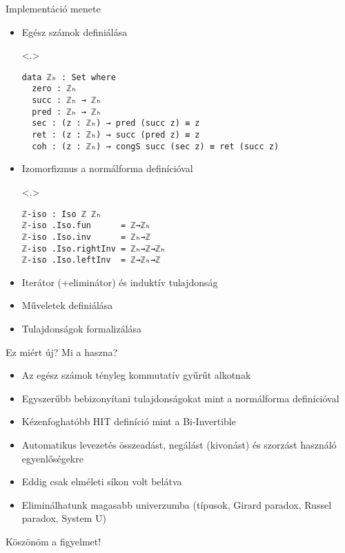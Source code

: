 \documentclass[14pt, aspectratio=1610]{beamer}
\begin{document}
\begin{frame}[fragile]{Implementáció menete}

\begin{itemize}[<+->]
  \item Egész számok definiálása
    \begin{onlyenv}<.>
    \begin{verbatim}
data ℤₕ : Set where
  zero : ℤₕ
  succ : ℤₕ → ℤₕ
  pred : ℤₕ → ℤₕ
  sec : (z : ℤₕ) → pred (succ z) ≡ z
  ret : (z : ℤₕ) → succ (pred z) ≡ z
  coh : (z : ℤₕ) → congS succ (sec z) ≡ ret (succ z)
    \end{verbatim}
    \end{onlyenv}
  \item Izomorfizmus a normálforma definícióval
    \begin{onlyenv}<.>
    \begin{verbatim}
ℤ-iso : Iso ℤ ℤₕ
ℤ-iso .Iso.fun      = ℤ→ℤₕ
ℤ-iso .Iso.inv      = ℤₕ→ℤ
ℤ-iso .Iso.rightInv = ℤₕ→ℤ→ℤₕ
ℤ-iso .Iso.leftInv  = ℤ→ℤₕ→ℤ
    \end{verbatim}
    \end{onlyenv}
  \item Iterátor (+eliminátor) és induktív tulajdonság
  \item Műveletek definiálása
  \item Tulajdonságok formalizálása
\end{itemize}

\end{frame}

\begin{frame}{Ez miért új? Mi a haszna?}

\begin{itemize}[<+->]
    \item Az egész számok tényleg kommutatív gyűrűt alkotnak
    \item Egyszerűbb bebizonyítani tulajdonságokat mint a normálforma definícióval
    \item Kézenfoghatóbb HIT definíció mint a Bi-Invertible
    \item Automatikus levezetés összeadást, negálást (kivonást) és szorzást használó egyenlőségekre
    \item Eddig csak elméleti síkon volt belátva
    \item Eliminálhatunk magasabb univerzumba (típusok, Girard paradox, Russel paradox, System U)
\end{itemize}

\end{frame}

\begin{frame}[plain]
  \centering
  \Huge
  Köszönöm a figyelmet!
\end{frame}
\end{document}
